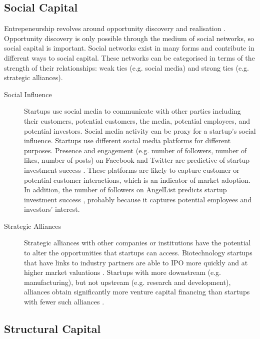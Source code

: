 \subsection{Social Capital}

Entrepeneurship revolves around opportunity discovery and realisation \cite{shane2000}. Opportunity discovery is only possible through the medium of social networks, so social capital is important. Social networks exist in many forms and contribute in different ways to social capital. These networks can be categorised in terms of the strength of their relationships: weak ties (e.g. social media) and strong ties (e.g. strategic alliances).

\begin{description}

\item[Social Influence]

Startups use social media to communicate with other parties including their customers, potential customers, the media, potential employees, and potential investors. Social media activity can be proxy for a startup's social influence. Startups use different social media platforms for different purposes. Presence and engagement (e.g. number of followers, number of likes, number of posts) on Facebook and Twitter are predictive of startup investment success \cite{cheng2016,beckwith2016}. These platforms are likely to capture customer or potential customer interactions, which is an indicator of market adoption. In addition, the number of followers on AngelList predicts startup investment success \cite{an2015}, probably because it captures potential employees and investors' interest.

\item[Strategic Alliances]

Strategic alliances with other companies or institutions have the potential to alter the opportunities that startups can access. Biotechnology startups that have links to industry partners are able to IPO more quickly and at higher market valuations \cite{stuart1999}. Startups with more downstream (e.g. manufacturing), but not upstream (e.g. research and development), alliances obtain significantly more venture capital financing than startups with fewer such alliances \cite{baum2004}.

\end{description}

\subsection{Structural Capital}

